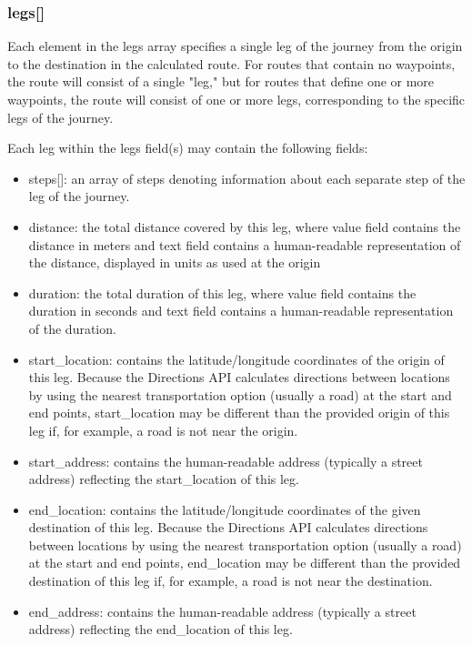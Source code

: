 \subsubsection{legs[]}

Each element in the legs array specifies a single leg of the journey from the origin to the destination in the calculated route. For routes that contain 
no waypoints, the route will consist of a single "leg," but for routes that define one or more waypoints, the route will consist of one or more legs, 
corresponding to the specific legs of the journey.

Each leg within the legs field(s) may contain the following fields:

\begin{itemize}
 \item steps[]: an array of steps denoting information about each separate step of the leg of the journey.
 \item distance: the total distance covered by this leg, where value field contains the distance in meters and text field contains a human-readable representation of 
 the distance, displayed in units as used at the origin
 \item duration: the total duration of this leg, where value field contains the duration in seconds and text field contains a human-readable representation of the duration.
 \item start\_location: contains the latitude/longitude coordinates of the origin of this leg. Because the Directions API calculates directions between locations 
 by using the nearest transportation option (usually a road) at the start and end points, start\_location may be different than the provided origin of this leg 
 if, for example, a road is not near the origin.
 \item start\_address: contains the human-readable address (typically a street address) reflecting the start\_location of this leg.
 \item end\_location: contains the latitude/longitude coordinates of the given destination of this leg. Because the Directions API calculates directions 
 between locations by using the nearest transportation option (usually a road) at the start and end points, end\_location may be different than the provided 
 destination of this leg if, for example, a road is not near the destination.
 \item end\_address: contains the human-readable address (typically a street address) reflecting the end\_location of this leg.
\end{itemize}

